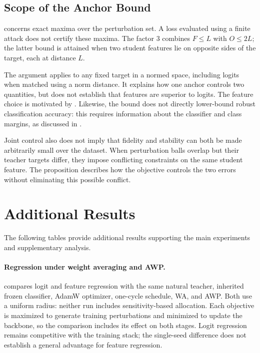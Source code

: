 \FloatBarrier
\subsection{Scope of the Anchor Bound}
\label{app:anchor_scope}

 concerns exact maxima over the perturbation set. A loss evaluated using a finite
attack does not certify these maxima. The factor $3$ combines $F\le L$ with $O\le2L$; the latter
bound is attained when two student features lie on opposite sides of the target, each at distance $L$.

The argument applies to any fixed target in a normed space, including logits when matched using a
norm distance. It explains how one anchor controls two quantities, but does not establish that
features are superior to logits. The feature choice is motivated by . Likewise,
the bound does not directly lower-bound robust classification accuracy: this requires information
about the classifier and class margins, as discussed in .

Joint control also does not imply that fidelity and stability can both be made arbitrarily small
over the dataset. When perturbation balls overlap but their teacher targets differ, they impose
conflicting constraints on the same student feature. The proposition describes how the objective
controls the two errors without eliminating this possible conflict.

\section{Additional Results}
\label{app:more}

The following tables provide additional results supporting the main experiments and supplementary
analysis.

\paragraph{Regression under weight averaging and AWP.}
 compares logit and feature regression with the same natural teacher,
inherited frozen classifier, AdamW optimizer, one-cycle schedule, WA, and AWP. Both use a uniform
radius: neither run includes sensitivity-based allocation. Each objective is maximized to generate
training perturbations and minimized to update the backbone, so the comparison includes its effect
on both stages. Logit regression remains competitive with the training stack; the single-seed
difference does not establish a general advantage for feature regression.

